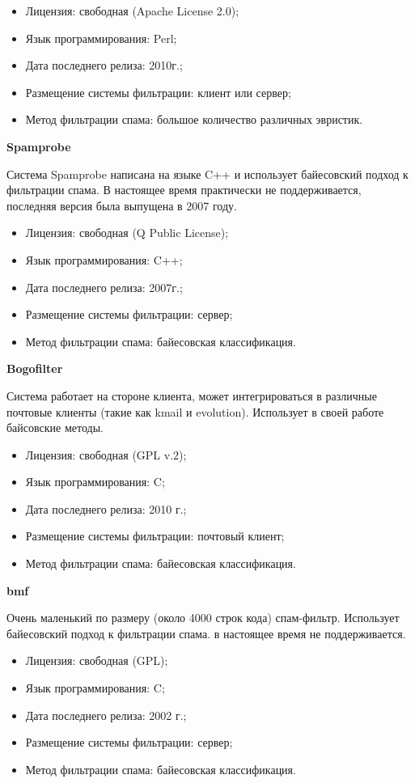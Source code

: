 \begin{itemize}
\item Лицензия: свободная (Apache License 2.0);
\item Язык программирования: Perl;
\item Дата последнего релиза: 2010г.;
\item Размещение системы фильтрации: клиент или сервер;
\item Метод фильтрации спама: большое количество различных эвристик.
\end{itemize}

\textbf{Spamprobe}

Система Spamprobe написана на языке C++ и использует байесовский подход к фильтрации спама. В настоящее время практически не поддерживается, последняя версия была выпущена в 2007 году.
\begin{itemize}
\item Лицензия: свободная (Q Public License); 
\item Язык программирования: C++;
\item Дата последнего релиза: 2007г.;
\item Размещение системы фильтрации: сервер;
\item Метод фильтрации спама: байесовская классификация.
\end{itemize}

\textbf{Bogofilter}

Система работает на стороне клиента, может интегрироваться в различные почтовые клиенты (такие как kmail и evolution). Использует в своей работе байсовские методы.
\begin{itemize}
\item Лицензия: свободная (GPL v.2); 
\item Язык программирования: C;
\item Дата последнего релиза: 2010 г.;
\item Размещение системы фильтрации: почтовый клиент;
\item Метод фильтрации спама: байесовская классификация.
\end{itemize}

\textbf{bmf}

Очень маленький по размеру (около 4000 строк кода) спам-фильтр. Использует байесовский подход к фильтрации спама. в настоящее время не поддерживается.
\begin{itemize}
\item Лицензия: свободная (GPL); 
\item Язык программирования: C;
\item Дата последнего релиза: 2002 г.;
\item Размещение системы фильтрации: сервер;
\item Метод фильтрации спама: байесовская классификация.
\end{itemize}

